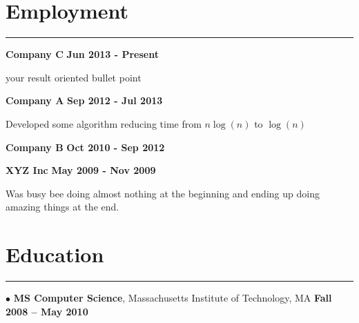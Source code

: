 \section{Employment}
\noindent\rule{\textwidth}{\hlinewidth}
{\textbf{Company C}}
{\hfill \textbf{Jun 2013 - Present}}
\begin{innerlist}
	\item your result oriented bullet point
	\item \blinddescription[1]
	\item \blinddescription[1]
\end{innerlist}
{\textbf{Company A} }
{\hfill \textbf{Sep 2012 - Jul 2013 }}
\begin{innerlist}
	\item Developed some algorithm reducing time from $n \log(n)$ to $\log(n)$
\end{innerlist}
{\textbf{Company B}}
{\textbf{Oct 2010 - {Sep 2012}}}
\begin{innerlist}
	\item \blinddescription[1]
	\item \blinddescription[1]
\end{innerlist}
{\textbf{{XYZ Inc}}}
{\textbf{May 2009 - Nov 2009}}
\begin{innerlist}
	\item Was busy bee doing almost nothing at the beginning and ending up 
			doing amazing things at the end.
\end{innerlist}
\section{Education}
    \noindent\rule{\textwidth}{\hlinewidth}
    $\bullet$ \textbf{MS Computer Science},
                      Massachusetts Institute of Technology, MA
                      \hfill\textbf{Fall 2008 -- May 2010}\\
